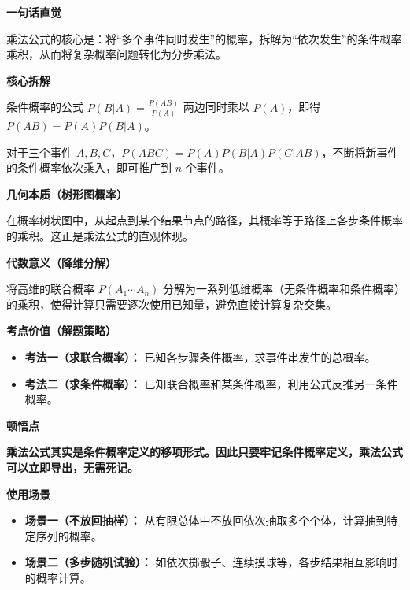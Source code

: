 \begin{explanationbox}
	\textbf{\textcolor{CExplanation}{一句话直觉}}

	乘法公式的核心是：将“多个事件同时发生”的概率，拆解为“依次发生”的条件概率乘积，从而将复杂概率问题转化为分步乘法。

	\medskip
	\textbf{\textcolor{CExplanation}{核心拆解}}
	\begin{description}[style=nextline, leftmargin=2.8em, labelsep=0.5em, itemsep=0.45em]
		\item[\textbf{要点一（条件概率定义）：}] 条件概率的公式 $P(B|A)=\frac{P(AB)}{P(A)}$ 两边同时乘以 $P(A)$，即得 $P(AB)=P(A)P(B|A)$。
		\item[\textbf{要点二（递推扩展）：}] 对于三个事件 $A,B,C$，$P(ABC)=P(A)P(B|A)P(C|AB)$，不断将新事件的条件概率依次乘入，即可推广到 $n$ 个事件。
	\end{description}

	\medskip
	\textbf{\textcolor{CExplanation}{几何本质（树形图概率）}}

	在概率树状图中，从起点到某个结果节点的路径，其概率等于路径上各步条件概率的乘积。这正是乘法公式的直观体现。

	\medskip
	\textbf{\textcolor{CExplanation}{代数意义（降维分解）}}

	将高维的联合概率 $P(A_1\cdots A_n)$ 分解为一系列低维概率（无条件概率和条件概率）的乘积，使得计算只需要逐次使用已知量，避免直接计算复杂交集。

	\medskip
	\textbf{\textcolor{CExplanation}{考点价值（解题策略）}}
	\begin{itemize}[leftmargin=*, itemsep=0.5em, topsep=0.4em]
		\item \textbf{考法一（求联合概率）：} 已知各步骤条件概率，求事件串发生的总概率。
		\item \textbf{考法二（求条件概率）：} 已知联合概率和某条件概率，利用公式反推另一条件概率。
	\end{itemize}

	\medskip
	\textbf{\textcolor{CExplanation}{顿悟点}}

	\textbf{乘法公式其实是条件概率定义的移项形式。因此只要牢记条件概率定义，乘法公式可以立即导出，无需死记。}

	\medskip
	\textbf{\textcolor{CExplanation}{使用场景}}
	\begin{itemize}[leftmargin=*, itemsep=0.5em, topsep=0.4em]
		\item \textbf{场景一（不放回抽样）：} 从有限总体中不放回依次抽取多个个体，计算抽到特定序列的概率。
		\item \textbf{场景二（多步随机试验）：} 如依次掷骰子、连续摸球等，各步结果相互影响时的概率计算。
	\end{itemize}
\end{explanationbox}
